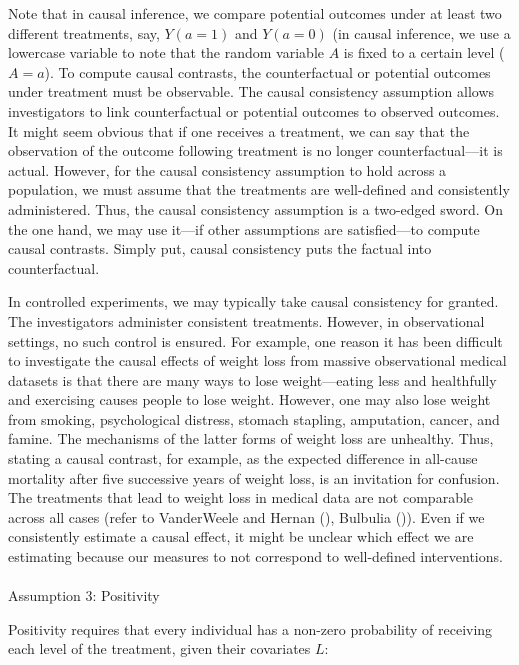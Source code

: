 \documentclass[
  singlecolumn]{article}
\makeatletter
\let\oldparagraph\paragraph
\renewcommand{\paragraph}{
    \@ifstar
      \xxxParagraphStar
      \xxxParagraphNoStar
  }
\newcommand{\xxxParagraphStar}[1]{\oldparagraph*{#1}\mbox{}}
\newcommand{\xxxParagraphNoStar}[1]{\oldparagraph{#1}\mbox{}}
\makeatother
\begin{document}
Note that in causal inference, we compare potential outcomes under at
least two different treatments, say, \(Y(a = 1)\) and \(Y(a = 0)\) (in
causal inference, we use a lowercase variable to note that the random
variable \(A\) is fixed to a certain level (\(A = a\)). To compute
causal contrasts, the counterfactual or potential outcomes under
treatment must be observable. The causal consistency assumption allows
investigators to link counterfactual or potential outcomes to observed
outcomes. It might seem obvious that if one receives a treatment, we can
say that the observation of the outcome following treatment is no longer
counterfactual---it is actual. However, for the causal consistency
assumption to hold across a population, we must assume that the
treatments are well-defined and consistently administered. Thus, the
causal consistency assumption is a two-edged sword. On the one hand, we
may use it---if other assumptions are satisfied---to compute causal
contrasts. Simply put, causal consistency puts the factual into
counterfactual.

In controlled experiments, we may typically take causal consistency for
granted. The investigators administer consistent treatments. However, in
observational settings, no such control is ensured. For example, one
reason it has been difficult to investigate the causal effects of weight
loss from massive observational medical datasets is that there are many
ways to lose weight---eating less and healthfully and exercising causes
people to lose weight. However, one may also lose weight from smoking,
psychological distress, stomach stapling, amputation, cancer, and
famine. The mechanisms of the latter forms of weight loss are unhealthy.
Thus, stating a causal contrast, for example, as the expected difference
in all-cause mortality after five successive years of weight loss, is an
invitation for confusion. The treatments that lead to weight loss in
medical data are not comparable across all cases (refer to VanderWeele
and Hernan (), Bulbulia
()). Even if we consistently estimate
a causal effect, it might be unclear which effect we are estimating
because our measures to not correspond to well-defined interventions.

\paragraph{Assumption 3: Positivity}\label{assumption-3-positivity}

Positivity requires that every individual has a non-zero probability of
receiving each level of the treatment, given their covariates \(L\):
\end{document}
